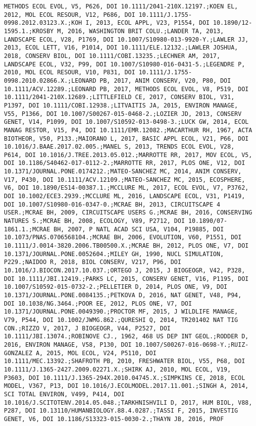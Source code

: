 \documentclass[]{article}
\begin{document}
\begin{verbatim}
METHODS ECOL EVOL, V5, P626, DOI 10.1111/2041-210X.12197.;KOEN EL, 2012, MOL ECOL RESOUR, V12, P686, DOI 10.1111/J.1755-0998.2012.03123.X.;KOH I, 2013, ECOL APPL, V23, P1554, DOI 10.1890/12-1595.1.;KROSBY M, 2016, WASHINGTON BRIT COLU.;LANDER TA, 2013, LANDSCAPE ECOL, V28, P1769, DOI 10.1007/S10980-013-9920-Y.;LAWLER JJ, 2013, ECOL LETT, V16, P1014, DOI 10.1111/ELE.12132.;LAWLER JOSHUA, 2018, CONSERV BIOL, DOI 10.1111/COBI.13235.;LECHNER AM, 2017, LANDSCAPE ECOL, V32, P99, DOI 10.1007/S10980-016-0431-5.;LEGENDRE P, 2010, MOL ECOL RESOUR, V10, P831, DOI 10.1111/J.1755-0998.2010.02866.X.;LEONARD PB, 2017, ANIM CONSERV, V20, P80, DOI 10.1111/ACV.12289.;LEONARD PB, 2017, METHODS ECOL EVOL, V8, P519, DOI 10.1111/2041-210X.12689.;LITTLEFIELD CE, 2017, CONSERV BIOL, V31, P1397, DOI 10.1111/COBI.12938.;LITVAITIS JA, 2015, ENVIRON MANAGE, V55, P1366, DOI 10.1007/S00267-015-0468-2.;LOZIER JD, 2013, CONSERV GENET, V14, P1099, DOI 10.1007/S10592-013-0498-3.;LUCK GW, 2014, ECOL MANAG RESTOR, V15, P4, DOI 10.1111/EMR.12082.;MACARTHUR RH, 1967, ACTA BIOTHEOR, V50, P133.;MAIORANO L, 2017, BASIC APPL ECOL, V21, P66, DOI 10.1016/J.BAAE.2017.02.005.;MANEL S, 2013, TRENDS ECOL EVOL, V28, P614, DOI 10.1016/J.TREE.2013.05.012.;MARROTTE RR, 2017, MOV ECOL, V5, DOI 10.1186/S40462-017-0112-2.;MARROTTE RR, 2017, PLOS ONE, V12, DOI 10.1371/JOURNAL.PONE.0174212.;MATEO-SANCHEZ MC, 2014, ANIM CONSERV, V17, P430, DOI 10.1111/ACV.12109.;MATEO-SANCHEZ MC, 2015, ECOSPHERE, V6, DOI 10.1890/ES14-00387.1.;MCCLURE ML, 2017, ECOL EVOL, V7, P3762, DOI 10.1002/ECE3.2939.;MCCLURE ML, 2016, LANDSCAPE ECOL, V31, P1419, DOI 10.1007/S10980-016-0347-0.;MCRAE BH, 2013, CIRCUITSCAPE 4 USER.;MCRAE BH, 2009, CIRCUITSCAPE USERS G.;MCRAE BH, 2016, CONSERVING NATURES S.;MCRAE BH, 2008, ECOLOGY, V89, P2712, DOI 10.1890/07-1861.1.;MCRAE BH, 2007, P NATL ACAD SCI USA, V104, P19885, DOI 10.1073/PNAS.0706568104.;MCRAE BH, 2006, EVOLUTION, V60, P1551, DOI 10.1111/J.0014-3820.2006.TB00500.X.;MCRAE BH, 2012, PLOS ONE, V7, DOI 10.1371/JOURNAL.PONE.0052604.;MILEY GH, 1990, NUCL SIMULATION, P229.;NAIDOO R, 2018, BIOL CONSERV, V217, P96, DOI 10.1016/J.BIOCON.2017.10.037.;ORTEGO J, 2015, J BIOGEOGR, V42, P328, DOI 10.1111/JBI.12419.;PARKS LC, 2015, CONSERV GENET, V16, P1195, DOI 10.1007/S10592-015-0732-2.;PELLETIER D, 2014, PLOS ONE, V9, DOI 10.1371/JOURNAL.PONE.0084135.;PETKOVA D, 2016, NAT GENET, V48, P94, DOI 10.1038/NG.3464.;POOR EE, 2012, PLOS ONE, V7, DOI 10.1371/JOURNAL.PONE.0049390.;PROCTOR MF, 2015, J WILDLIFE MANAGE, V79, P544, DOI 10.1002/JWMG.862.;QURESHI Q, 2014, TR201402 NAT TIG CON.;RIZZO V, 2017, J BIOGEOGR, V44, P2527, DOI 10.1111/JBI.13074.;ROBINOVE CJ., 1962, 468 US DEP INT GEOL.;RODDER D, 2016, ENVIRON MANAGE, V58, P130, DOI 10.1007/S00267-016-0698-Y.;RUIZ-GONZALEZ A, 2015, MOL ECOL, V24, P5110, DOI 10.1111/MEC.13392.;SHAFROTH PB, 2010, FRESHWATER BIOL, V55, P68, DOI 10.1111/J.1365-2427.2009.02271.X.;SHIRK AJ, 2010, MOL ECOL, V19, P3603, DOI 10.1111/J.1365-294X.2010.04745.X.;SIMPKINS CE, 2018, ECOL MODEL, V367, P13, DOI 10.1016/J.ECOLMODEL.2017.11.001.;SINGH A, 2014, SCI TOTAL ENVIRON, V499, P414, DOI 10.1016/J.SCITOTENV.2014.05.048.;TARKHNISHVILI D, 2017, HUM BIOL, V88, P287, DOI 10.13110/HUMANBIOLOGY.88.4.0287.;TASSI F, 2015, INVESTIG GENET, V6, DOI 10.1186/S13323-015-0030-2.;THAYN JB, 2016, PROF 
\end{verbatim}
\end{document}
